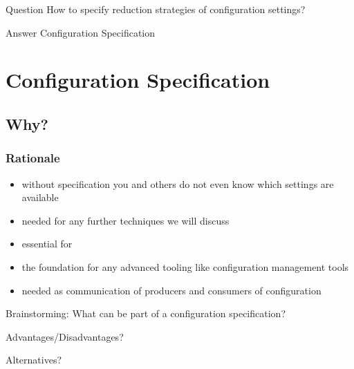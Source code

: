 \begin{frame}
	\begin{alertblock}{Question}
	How to specify reduction strategies of configuration settings?
	\end{alertblock}
	\pause
	\begin{exampleblock}{Answer}
	Configuration Specification
	\end{exampleblock}
\end{frame}

\section{Configuration Specification}

\subsection{Why?}

\begin{frame}
	\frametitle{Rationale}
	\begin{itemize}
	\item without specification you and others do not even know which settings are available
	\item needed for any further techniques we will discuss
	\pause
	\item essential for ~\citet{holland2001nofutz}
	\item the foundation for any advanced tooling like configuration management tools
	\pause
	\item needed as communication of producers and consumers of configuration
	\end{itemize}
\end{frame}

\begin{assignment}
	\begin{task}
	Brainstorming: What can be part of a configuration specification?
	\end{task}

	\begin{task}
	Advantages/Disadvantages?
	\end{task}

	\begin{task}
	Alternatives?
	\end{task}
\end{assignment}

\begin{frame}
	\methodQuestion{}
\end{frame}


